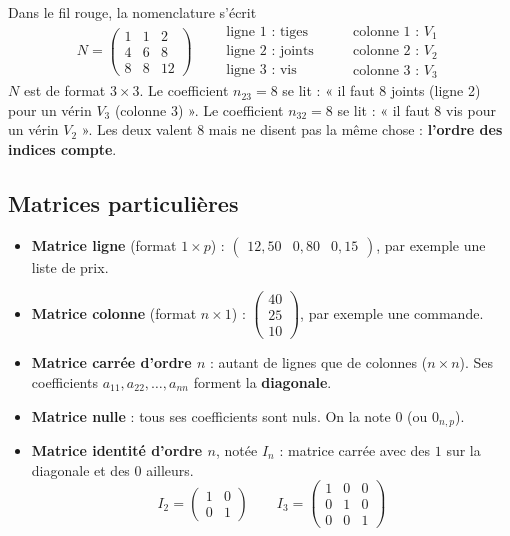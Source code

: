\documentclass[a4paper,11pt]{article}
\newcommand{\M}[1]{\begin{pmatrix}#1\end{pmatrix}}
\begin{document}
\begin{exemple}\label{ex:lire}
Dans le fil rouge, la nomenclature s'écrit
\[
N = \M{1 & 1 & 2\\ 4 & 6 & 8\\ 8 & 8 & 12}
\qquad
\begin{array}{l}
\text{ligne 1 : tiges}\\ \text{ligne 2 : joints}\\ \text{ligne 3 : vis}
\end{array}
\qquad
\begin{array}{l}
\text{colonne 1 : } V_1\\ \text{colonne 2 : } V_2\\ \text{colonne 3 : } V_3
\end{array}
\]
$N$ est de format $3\times 3$. Le coefficient $n_{23}=8$ se lit : « il faut $8$ joints (ligne 2) pour un vérin $V_3$ (colonne 3) ». Le coefficient $n_{32}=8$ se lit : « il faut $8$ vis pour un vérin $V_2$ ». Les deux valent 8 mais ne disent pas la même chose : \textbf{l'ordre des indices compte}.
\end{exemple}

\subsection{Matrices particulières}\label{subsec:particulieres}

\begin{definition}
\begin{itemize}
  \item \textbf{Matrice ligne} (format $1\times p$) : $\M{12{,}50 & 0{,}80 & 0{,}15}$, par exemple une liste de prix.
  \item \textbf{Matrice colonne} (format $n\times 1$) : $\M{40\\25\\10}$, par exemple une commande.
  \item \textbf{Matrice carrée d'ordre $n$} : autant de lignes que de colonnes ($n\times n$). Ses coefficients $a_{11}, a_{22}, \dots, a_{nn}$ forment la \textbf{diagonale}.
  \item \textbf{Matrice nulle} : tous ses coefficients sont nuls. On la note $0$ (ou $0_{n,p}$).
  \item \textbf{Matrice identité d'ordre $n$}, notée $I_n$ : matrice carrée avec des $1$ sur la diagonale et des $0$ ailleurs.
  \[
  I_2 = \M{1 & 0\\ 0 & 1} \qquad I_3 = \M{1 & 0 & 0\\ 0 & 1 & 0\\ 0 & 0 & 1}
  \]
\end{itemize}
\end{definition}
\end{document}
